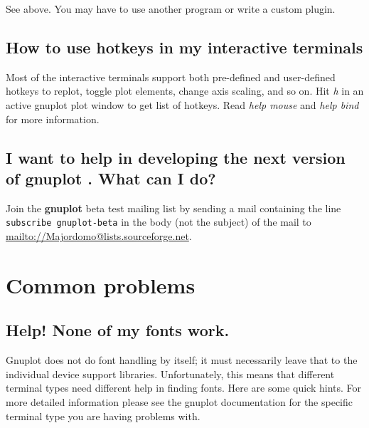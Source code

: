 \documentclass[letter,11pt]{article}
\def\mailto#1{{\small\href{mailto://#1}{\url{mailto://#1}}}}
\newcommand{\mailto}[1]%
            {\htmladdnormallink{\latex{\url{<#1>}}\html{\textit{#1}}}%
                {mailto:#1}%
            }
\newcommand{\gnuplot}{\textbf{gnuplot }}
\begin{document}
{See above. You may have to use another program or write a custom plugin.


\subsection{How to use hotkeys in my interactive terminals}

Most of the interactive terminals support both pre-defined and user-defined
hotkeys to replot, toggle plot elements, change axis scaling, and so on.
Hit \textit{h} in an active gnuplot plot window to get list of hotkeys.
Read \textit{help mouse} and \textit{help bind} for more information.


\subsection{I want to help in developing the next version of \gnuplot.
What can I do?}

Join the \gnuplot beta test mailing list by sending a mail
containing the line
\verb+subscribe gnuplot-beta+
in the body (not the subject) of the mail to
\mailto{Majordomo@lists.sourceforge.net}.


\section{Common problems}


\subsection{Help! None of my fonts work.}

Gnuplot does not do font handling by itself; it must necessarily leave
that to the individual device support libraries. Unfortunately, this
means that different terminal types need different help in finding
fonts. Here are some quick hints. For more detailed information please
see the gnuplot documentation for the specific terminal type you are
having problems with.

}
\end{document}
